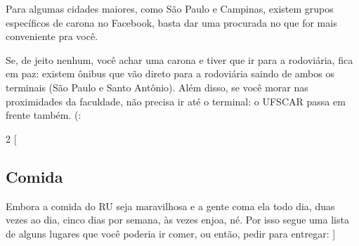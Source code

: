Para algumas cidades maiores, como São Paulo e Campinas, existem grupos específicos de carona no Facebook, basta dar uma procurada no que for mais conveniente pra você.

Se, de jeito nenhum, você achar uma carona e tiver que ir para a rodoviária, fica em paz: existem ônibus que vão direto para a rodoviária saindo de ambos os terminais (São Paulo e Santo Antônio). Além disso, se você morar nas proximidades da faculdade, não precisa ir até o terminal: o UFSCAR passa em frente também. (:  

\begin{multicols}{2}
  [
  \subsection{Comida}
  Embora a comida do RU seja maravilhosa e a gente coma ela todo dia, duas vezes ao dia, cinco dias por semana, às vezes enjoa, né. Por isso segue uma lista de alguns lugares que você poderia ir comer, ou então, pedir para entregar:
  ]


\end{multicols}
